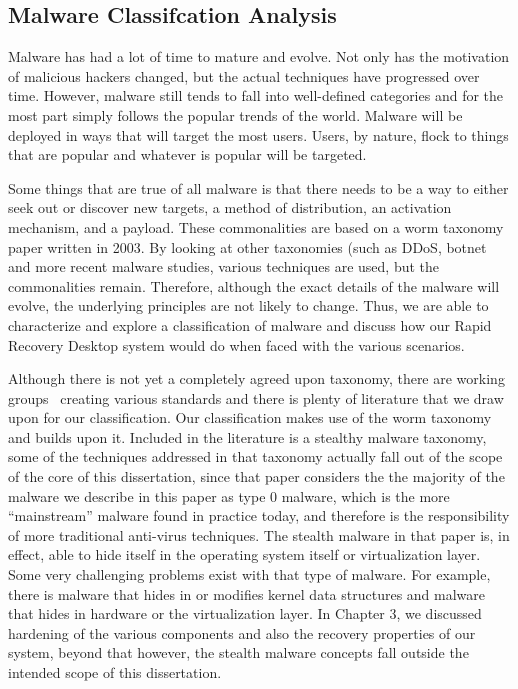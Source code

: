 \subsection{Malware Classifcation Analysis}

Malware has had a lot of time to mature and evolve. Not only has the motivation of malicious hackers changed, but the actual techniques have progressed over time. However, malware still tends to fall into well-defined categories and for the most part simply follows the popular trends of the world. Malware will be deployed in ways that will target the most users. Users, by nature, flock to things that are popular and whatever is popular will be targeted.

Some things that are true of all malware is that there needs to be a way to either seek out or discover new targets, a method of distribution, an activation mechanism, and a payload. These commonalities are based on a worm taxonomy paper\cite{worm_taxonomy_2003} written in 2003. By looking at other taxonomies (such as DDoS\cite{DDoS_taxonomy_2004}, botnet\cite{botnet_taxonomy_2005} and more recent malware studies\cite{leet09_malware}, various techniques are used, but the commonalities remain. Therefore, although the exact details of the malware will evolve, the underlying principles are not likely to change. Thus, we are able to characterize and explore a classification of malware and discuss how our Rapid Recovery Desktop system would do when faced with the various scenarios.

Although there is not yet a completely agreed upon taxonomy, there are working groups~\cite{maec_website,capec_website,IEEE-SA_malwale_working_group_website} creating various standards and there is plenty of literature\cite{worm_taxonomy_2003, DDoS_taxonomy_2004, botnet_taxonomy_2005, stealth_malware_taxonomy_2006} that we draw upon for our classification. Our classification makes use of the worm taxonomy\cite{worm_taxonomy_2003} and builds upon it. Included in the literature is a stealthy malware taxonomy, some of the techniques addressed in that taxonomy actually fall out of the scope of the core of this dissertation, since that paper considers the the majority of the malware we describe in this paper as type 0 malware, which is the more ``mainstream'' malware found in practice today, and therefore is the responsibility of more traditional anti-virus techniques. The stealth malware in that paper is, in effect, able to hide itself in the operating system itself or virtualization layer. Some very challenging problems exist with that type of malware. For example, there is malware that hides in or modifies kernel data structures and malware that hides in hardware or the virtualization layer. In Chapter 3, we discussed hardening of the various components and also the recovery properties of our system, beyond that however, the stealth malware concepts fall outside the intended scope of this dissertation.

